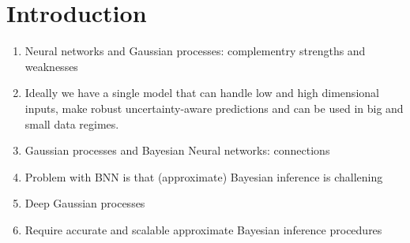 \chapter{Introduction}  %



\begin{enumerate}
    \item Neural networks and Gaussian processes: complementry strengths and weaknesses
    \item Ideally we have a single model that can handle low and high dimensional inputs, make robust uncertainty-aware predictions and can be used in big and small data regimes.
    \item Gaussian processes and Bayesian Neural networks: connections \citep{neal1992bayesian,neal1996bayesian,williams1996gaussian}
    \item Problem with BNN is that (approximate) Bayesian inference is challening
    \item Deep Gaussian processes \citep{Damianou2013}
    \item Require accurate and scalable approximate Bayesian inference procedures
\end{enumerate}





